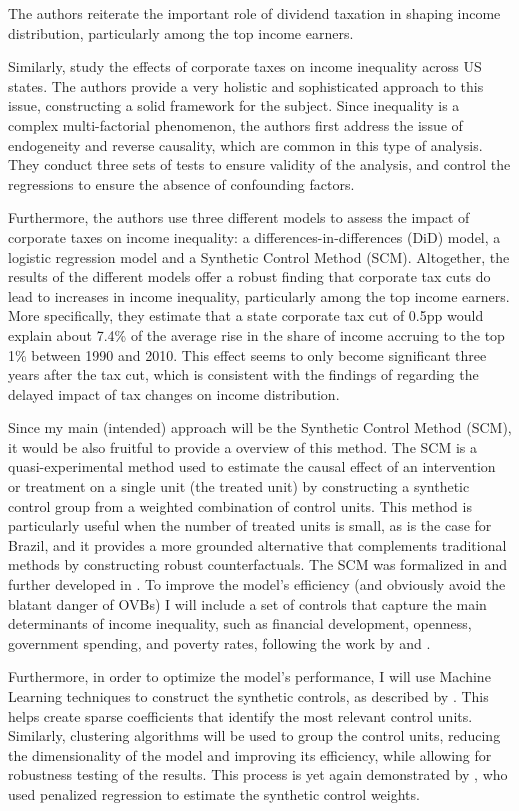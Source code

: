 \documentclass[11pt,a4paper]{article}
\begin{document}
The authors reiterate the important role of dividend taxation in shaping income distribution, particularly among the top income earners.
\par
Similarly, \cite{nallareddy2021corporate} study the effects of corporate taxes on income inequality across US states.
The authors provide a very holistic and sophisticated approach to this issue, constructing a solid framework for the subject.
Since inequality is a complex multi-factorial phenomenon, the authors first address the issue of endogeneity and reverse causality, which are common in this type of analysis.
They conduct three sets of tests to ensure validity of the analysis, and control the regressions to ensure the absence of confounding factors.
\par
Furthermore, the authors use three different models to assess the impact of corporate taxes on income inequality: a differences-in-differences (DiD) model, a logistic regression model and a Synthetic Control Method (SCM).
Altogether, the results of the different models offer a robust finding that corporate tax cuts do lead to increases in income inequality, particularly among the top income earners.
More specifically, they estimate that a state corporate tax cut of 0.5pp would explain about 7.4\% of the average rise in the share of income accruing to the top 1\% between 1990 and 2010.
This effect seems to only become significant three years after the tax cut, which is consistent with the findings of \cite{berman2024capital} regarding the delayed impact of tax changes on income distribution.
\par    
Since my main (intended) approach will be the Synthetic Control Method (SCM), it would be also fruitful to provide a overview of this method.
The SCM is a quasi-experimental method used to estimate the causal effect of an intervention or treatment on a single unit (the treated unit) by constructing a synthetic control group from a weighted combination of control units. 
This method is particularly useful when the number of treated units is small, as is the case for Brazil, and it provides a more grounded alternative that complements traditional methods by constructing robust counterfactuals.
The SCM was formalized in \cite{abadie2003economic} and further developed in \cite{abadie2010synthetic}.
To improve the model’s efficiency (and obviously avoid the blatant danger of OVBs) I will include a set of controls that capture the main determinants of income inequality, such as financial development, openness, government spending, and poverty rates, following the work by \cite{afandi2017determinants} and \cite{roine2009long}.
\par
Furthermore, in order to optimize the model’s performance, I will use Machine Learning techniques to construct the synthetic controls, as described by \cite{araujo2023synthetic}.
This helps create sparse coefficients that identify the most relevant control units.
Similarly, clustering algorithms will be used to group the control units, reducing the dimensionality of the model and improving its efficiency, while allowing for robustness testing of the results.
This process is yet again demonstrated by \cite{abadie2023penalized}, who used penalized regression to estimate the synthetic control weights.
\end{document}
